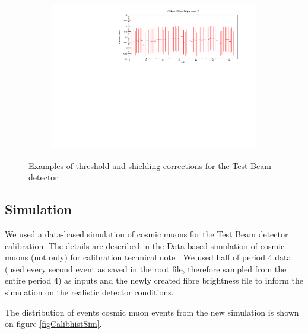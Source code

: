 \documentclass[12pt,a4paper]{article}
\begin{document}
\begin{figure}[hbtp]
\begin{subfigure}[t]{0.9\textwidth}
\includegraphics[width=\textwidth]{Plots/ThresholdCorrectionExample_cyview_fb7_P4DataBasedSim.pdf}
\end{subfigure}
\caption{Examples of threshold and shielding corrections for the Test Beam detector}
\label{figTBThresholdCorrections}
\end{figure}

\subsection{Simulation}\label{secSimulationResults}



We used a data-based simulation of cosmic muons for the Test Beam detector calibration. The details are described in the Data-based simulation of cosmic muons (not only) for calibration technical note \cite{NOVA-doc-60026}. We used half of period 4 data (used every second event as saved in the root file, therefore sampled from the entire period 4) as inputs and the newly created fibre brightness file to inform the simulation on the realistic detector conditions.

The distribution of events cosmic muon events from the new simulation is shown on figure \ref{figCalibhistSim}.
\end{document}
